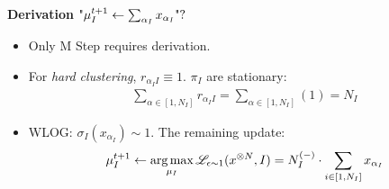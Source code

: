 \begin{frame} [t]
      {\bf Derivation}
    $ \textnormal{"}
        \mu ^{t+1} _{I} 
        \leftarrow 
          \sum _{\alpha _{I}} 
          x _{\alpha _{I}}  
      \textnormal{"?}
    $
\begin{itemize}
    \item Only M Step requires derivation. 
    \item For {\it hard clustering},
        $r _{\alpha _{I} I} \equiv 1$. 
        $\pi _{I}$ are stationary:
          { \footnotesize
          \begin{align*}
            \sum _{\alpha \in [1, N _{I}]}
            r _{\alpha _{I} I} 
           =
            \sum _{\alpha \in [1, N _{I}]}
            (1) 
           =
            N _{I}
          \end{align*}
          } 
    \item WLOG: 
          $ \sigma _{I} (x _{\alpha _{I}}) 
            \sim 1 
          $. The remaining update: 
        { \footnotesize
        \begin{align*}
            \mu _{I} ^{t+1} 
           \leftarrow 
            \operatorname*{\textnormal{arg}\,\textnormal{max}} _{\mu _{I}}
              \mathscr {L} _{\epsilon \sim 1} 
                (x ^{\otimes N}, I)
           = 
              N _{I} ^{(-)} \cdot
            \sum _{i\in [1,N _{I}]} 
                 x _{\alpha _{I}} 
        \end{align*}
        }
\end{itemize}
\end{frame}


